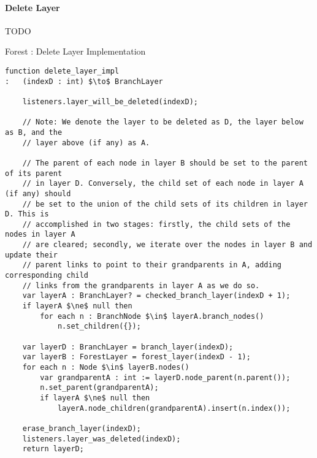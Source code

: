\paragraph{Delete Layer}

TODO

\begin{stulisting}[p]
\caption{Forest : Delete Layer Implementation}
\label{code:ipfs-forest-deletelayerimpl}
\begin{lstlisting}[style=Default]
function delete_layer_impl
:	(indexD : int) $\to$ BranchLayer

	listeners.layer_will_be_deleted(indexD);

	// Note: We denote the layer to be deleted as D, the layer below as B, and the
	// layer above (if any) as A.

	// The parent of each node in layer B should be set to the parent of its parent
	// in layer D. Conversely, the child set of each node in layer A (if any) should
	// be set to the union of the child sets of its children in layer D. This is
	// accomplished in two stages: firstly, the child sets of the nodes in layer A
	// are cleared; secondly, we iterate over the nodes in layer B and update their
	// parent links to point to their grandparents in A, adding corresponding child
	// links from the grandparents in layer A as we do so.
	var layerA : BranchLayer? = checked_branch_layer(indexD + 1);
	if layerA $\ne$ null then
		for each n : BranchNode $\in$ layerA.branch_nodes()
			n.set_children({});

	var layerD : BranchLayer = branch_layer(indexD);
	var layerB : ForestLayer = forest_layer(indexD - 1);
	for each n : Node $\in$ layerB.nodes()
		var grandparentA : int := layerD.node_parent(n.parent());
		n.set_parent(grandparentA);
		if layerA $\ne$ null then
			layerA.node_children(grandparentA).insert(n.index());

	erase_branch_layer(indexD);
	listeners.layer_was_deleted(indexD);
	return layerD;

\end{lstlisting}
\end{stulisting}

